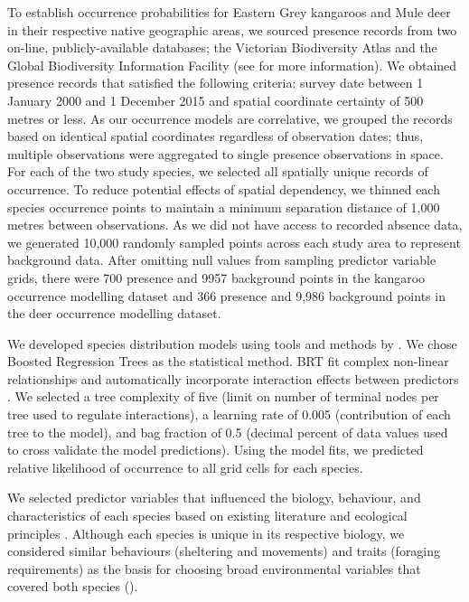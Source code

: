 To establish occurrence probabilities for Eastern Grey kangaroos and Mule deer in their respective native geographic areas, we sourced presence records from two on-line, publicly-available databases; the Victorian Biodiversity Atlas and the Global Biodiversity Information Facility (see  for more information). We obtained presence records that satisfied the following criteria: survey date between 1 January 2000 and 1 December 2015 and spatial coordinate certainty of 500 metres or less. As our occurrence models are correlative, we grouped the records based on identical spatial coordinates regardless of observation dates; thus, multiple observations were aggregated to single presence observations in space. For each of the two study species, we selected all spatially unique records of occurrence.  To reduce potential effects of spatial dependency, we thinned each species occurrence points to maintain a minimum separation distance of 1,000 metres between observations.  As we did not have access to recorded absence data, we generated 10,000 randomly sampled points across each study area to represent background data.  After omitting null values from sampling predictor variable grids, there were 700 presence and 9957 background points in the kangaroo occurrence modelling dataset and 366 presence and 9,986 background points in the deer occurrence modelling dataset.

We developed species distribution models using tools and methods by \cite{elit08}. We chose Boosted Regression Trees \citep[BRT, see][]{frie02} as the statistical method. BRT fit complex non-linear relationships and automatically incorporate interaction effects between predictors \citep{elit09}. We selected a tree complexity of five (limit on number of terminal nodes per tree used to regulate interactions), a learning rate of 0.005 (contribution of each tree to the model), and bag fraction of 0.5 (decimal percent of data values used to cross validate the model predictions). Using the model fits, we predicted relative likelihood of occurrence to all grid cells for each species.

We selected predictor variables that influenced the biology, behaviour, and characteristics of each species based on existing literature and ecological principles \citep[e.g.][]{coul10,ferg05}. Although each species is unique in its respective biology, we considered similar behaviours (sheltering and movements) and traits (foraging requirements) as the basis for choosing broad environmental variables that covered both species ().

